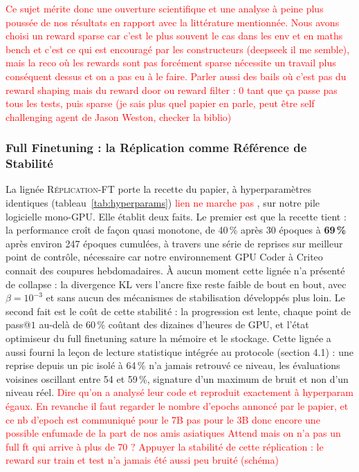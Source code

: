 \documentclass[11pt,a4paper]{article}
\begin{document}
\textcolor{red}{Ce sujet mérite donc une ouverture scientifique et une analyse à peine plus poussée de nos résultats en rapport avec la littérature mentionnée. Nous avons choisi un reward sparse car c'est le plus souvent le cas dans les env et en maths bench et c'est ce qui est encouragé par les constructeurs (deepseek il me semble), mais la reco où les rewards sont pas forcément sparse nécessite un travail plus conséquent dessus et on a pas eu à le faire. Parler aussi des bails où c'est pas du reward shaping mais du reward door ou reward filter : 0 tant que ça passe pas tous les tests, puis sparse (je sais plus quel papier en parle, peut être self challenging agent de Jason Weston, checker la biblio)} 


\subsubsection{Full Finetuning : la Réplication comme Référence de Stabilité}

La lignée \textsc{Réplication-FT} porte la recette du papier, à hyperparamètres identiques (tableau~\ref{tab:hyperparams}) \textcolor{red}{lien ne marche pas} , sur notre pile logicielle mono-GPU. Elle établit deux faits. Le premier est que la recette tient : la performance croît de façon quasi monotone, de 40\,\% après 30 époques à \textbf{69\,\%} après environ 247 époques cumulées, à travers une série de reprises sur meilleur point de contrôle, nécessaire car notre environnement GPU Coder à Criteo connait des coupures hebdomadaires. À aucun moment cette lignée n'a présenté de collapse : la divergence KL vers l'ancre fixe reste faible de bout en bout, avec $\beta = 10^{-3}$ et sans aucun des mécanismes de stabilisation développés plus loin. Le second fait est le coût de cette stabilité : la progression est lente, chaque point de pass@$1$ au-delà de 60\,\% coûtant des dizaines d'heures de GPU, et l'état optimiseur du full finetuning sature la mémoire et le stockage. Cette lignée a aussi fourni la leçon de lecture statistique intégrée au protocole (section 4.1) : une reprise depuis un pic isolé à 64\,\% n'a jamais retrouvé ce niveau, les évaluations voisines oscillant entre 54 et 59\,\%, signature d'un maximum de bruit et non d'un niveau réel.
\textcolor{red}{Dire qu'on a analysé leur code et reproduit exactement à hyperparam égaux. En revanche il faut regarder le nombre d'epochs annoncé par le papier, et ce nb d'epoch est communiqué pour le 7B pas pour le 3B donc encore une possible enfumade de la part de nos amis asiatiques} 
\textcolor{red}{Attend mais on n'a pas un full ft qui arrive à plus de 70 ?} 
\textcolor{red}{Appuyer la stabilité de cette réplication : le reward sur train et test n'a jamais été aussi peu bruité (schéma)} 
\end{document}
